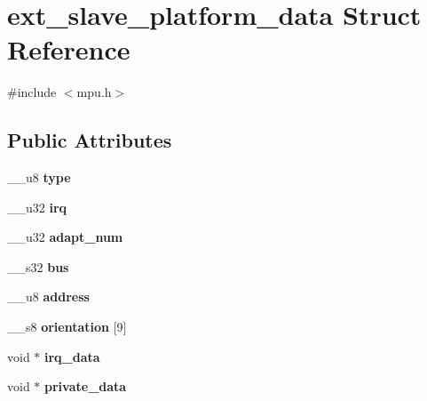 \hypertarget{structext__slave__platform__data}{}\section{ext\+\_\+slave\+\_\+platform\+\_\+data Struct Reference}
\label{structext__slave__platform__data}


{\ttfamily \#include $<$mpu.\+h$>$}

\subsection*{Public Attributes}
\begin{DoxyCompactItemize}
\item 
\hypertarget{structext__slave__platform__data_ae97bdc131ca5e2fd43883fe2ab8e6d25}{}\+\_\+\+\_\+u8 {\bfseries type}\label{structext__slave__platform__data_ae97bdc131ca5e2fd43883fe2ab8e6d25}

\item 
\hypertarget{structext__slave__platform__data_a3960465c7b482ff2cd34dbaa4a5d7cd2}{}\+\_\+\+\_\+u32 {\bfseries irq}\label{structext__slave__platform__data_a3960465c7b482ff2cd34dbaa4a5d7cd2}

\item 
\hypertarget{structext__slave__platform__data_ae8472a19e4a52547452221ec9ee150d9}{}\+\_\+\+\_\+u32 {\bfseries adapt\+\_\+num}\label{structext__slave__platform__data_ae8472a19e4a52547452221ec9ee150d9}

\item 
\hypertarget{structext__slave__platform__data_ad46c6ff0e38423eb7978fa246f1df73b}{}\+\_\+\+\_\+s32 {\bfseries bus}\label{structext__slave__platform__data_ad46c6ff0e38423eb7978fa246f1df73b}

\item 
\hypertarget{structext__slave__platform__data_adec33339625ad04895ed40adc9b2e29f}{}\+\_\+\+\_\+u8 {\bfseries address}\label{structext__slave__platform__data_adec33339625ad04895ed40adc9b2e29f}

\item 
\hypertarget{structext__slave__platform__data_afbb7e10273c4112acf679b39a9540c09}{}\+\_\+\+\_\+s8 {\bfseries orientation} \mbox{[}9\mbox{]}\label{structext__slave__platform__data_afbb7e10273c4112acf679b39a9540c09}

\item 
\hypertarget{structext__slave__platform__data_a1538553d11f1d479cea0fd3732672d33}{}void $\ast$ {\bfseries irq\+\_\+data}\label{structext__slave__platform__data_a1538553d11f1d479cea0fd3732672d33}

\item 
\hypertarget{structext__slave__platform__data_a11274e2e7a28f7652f0e95d7b53d94f9}{}void $\ast$ {\bfseries private\+\_\+data}\label{structext__slave__platform__data_a11274e2e7a28f7652f0e95d7b53d94f9}

\end{DoxyCompactItemize}


